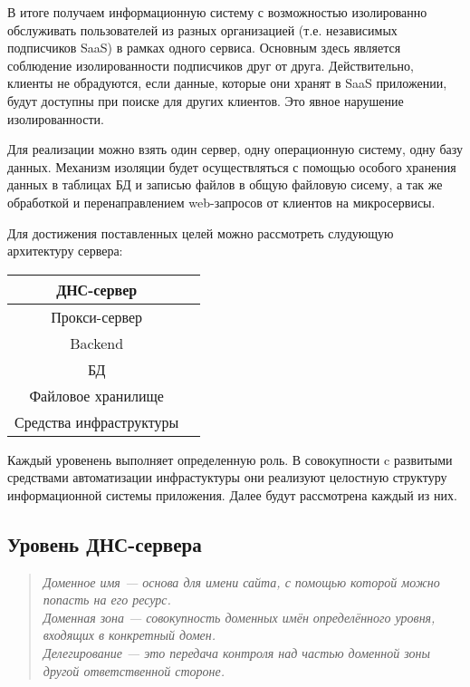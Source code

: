 В итоге получаем информационную систему с возможностью изолированно обслуживать пользователей из разных организацией (т.е. независимых подписчиков SaaS) в рамках одного сервиса. Основным здесь является соблюдение изолированности подписчиков друг от друга. Действительно, клиенты не обрадуются, если данные, которые они хранят в SaaS приложении, будут доступны при поиске для других клиентов. Это явное нарушение изолированности.

Для реализации можно взять один сервер, одну операционную систему, одну базу данных. Механизм изоляции будет осуществляться с помощью особого хранения данных в таблицах БД и записью файлов в общую файловую сисему, а так же обработкой и перенаправлением web-запросов от клиентов на микросервисы.

Для достижения поставленных целей можно рассмотреть слудующую архитектуру сервера:

\begin{center}
	\begin{tabular}[t]{|c|p{15em}|}
		\hline
			ДНС-сервер\\
		\hline
			Прокси-сервер\\
		\hline
			Backend\\
		\hline
			БД\\
		\hline
			Файловое хранилище\\
		\hline
			Средства инфраструктуры\\
		\hline
	\end{tabular}
\end{center}

Каждый уровенень выполняет определенную роль. В совокупности c развитыми средствами автоматизации инфрастуктуры они реализуют целостную структуру информационной системы приложения. Далее будут рассмотрена каждый из них.

\subsection{Уровень ДНС-сервера}

\begin{quote}
\itshape{\large Доменное имя} --- основа для имени сайта, с помощью которой можно попасть на его ресурс.\\
\itshape{\large Доменная зона} --- совокупность доменных имён определённого уровня, входящих в конкретный домен.\\
\itshape{\large Делегирование} --- это передача контроля над частью доменной зоны другой ответственной стороне.
\end{quote}

